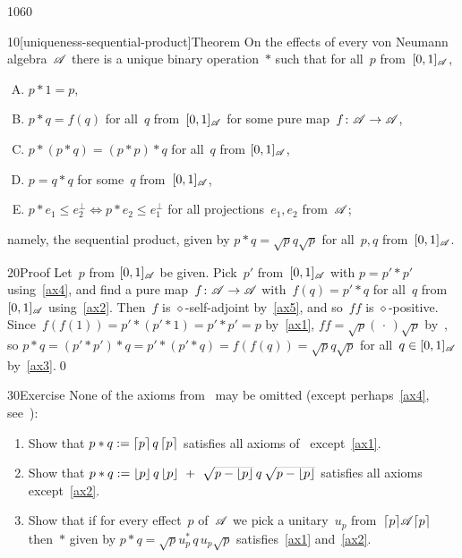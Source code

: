 \begin{parsec}{1060}%
\begin{point}{10}[uniqueness-sequential-product]{Theorem}%
On the effects of every von Neumann algebra~$\mathscr{A}$
there is a unique binary operation~$\ast$
such that for all~$p$ from~$[0,1]_{\mathscr{A}}$,
\begin{enumerate}[A.]
\item \label{ax1}
$p\ast 1 = p$,
\item
	\label{ax2}
$p\ast q = f(q)$
for all~$q$ from~$[0,1]_{\mathscr{A}}$
for some pure map~$f\colon \mathscr{A}\to\mathscr{A}$,
\item\label{ax3}
$p\ast (p\ast q)=(p\ast p)\ast q$
for all~$q$ from $[0,1]_{\mathscr{A}}$,
\item\label{ax4}
$p=q\ast q$ for some~$q$ from~$[0,1]_{\mathscr{A}}$,
\item\label{ax5}
$p \ast e_1 \leq e_2^\perp
\iff p\ast e_2 \leq e_1^\perp$
for all projections~$e_1,e_2$ from~$\mathscr{A}$;
\end{enumerate}
namely, the sequential product,
given by
$p\ast q = \sqrt{p}q\sqrt{p}$
for all~$p, q$ from~$[0,1]_{\mathscr{A}}$.
\begin{point}{20}{Proof}%
Let~$p$  from $[0,1]_{\mathscr{A}}$ be given.
Pick~$p'$ from~$[0,1]_{\mathscr{A}}$
with $p = p'\ast p'$
using~\ref{ax4},
and find a pure map~$f\colon \mathscr{A}\to\mathscr{A}$
with~$f(q)=p'\ast q$ for all~$q$ from $[0,1]_{\mathscr{A}}$
using~\ref{ax2}.
Then~$f$ is $\diamond$-self-adjoint by~\ref{ax5},
and so~$ff$ is $\diamond$-positive.
Since~$f(f(1))=p'\ast (p'\ast 1)
= p'\ast p'=p$ by~\ref{ax1},
$ff=\sqrt{p}(\,\cdot\,)\sqrt{p}$
by~,
so $p\ast q
= (p'\ast p')\ast q
= p'\ast (p' \ast q) = f(f(q))=\sqrt{p}q\sqrt{p}$
for all~$q\in [0,1]_{\mathscr{A}}$ by~\ref{ax3}.\qed
\end{point}
\end{point}
\begin{point}{30}{Exercise}%
None of the axioms
from~
may be omitted (except perhaps~\ref{ax4},
see~):
\begin{enumerate}
\item
Show that
$p\ast q := \left\lceil p\right\rceil q\left\lceil p\right\rceil$
satisfies all axioms of~
except~\ref{ax1}.
\item
Show that  $p\ast q := \left\lfloor p\right\rfloor q\left\lfloor p\right\rfloor\ +\ \smash{\sqrt{p-\left\lfloor p\right\rfloor}\,q\,
\sqrt{p-\left\lfloor p\right\rfloor}}$
satisfies all axioms except~\ref{ax2}.
\item
Show that if for every effect~$p$ of~$\mathscr{A}$
we pick a unitary~$u_p$ from~$\left\lceil p\right\rceil\!\mathscr{A}\!\left\lceil p\right\rceil$
then~$\ast$ given by
$p\ast q= \sqrt{p}u_p^* \,q\, u_p\sqrt{p}$
satisfies~\ref{ax1} and~\ref{ax2}.


\end{enumerate}
\end{point}
\end{parsec}
